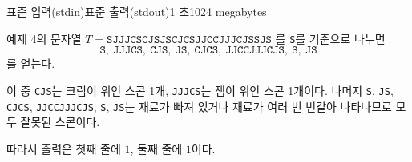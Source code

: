 \begin{problem}{\probtitle}{표준 입력(stdin)}{표준 출력(stdout)}{1 초}{1024 megabytes}
\Example

\begin{example}
\end{example}

\Notes

예제 4의 문자열 $T=\texttt{SJJJCSCJSJSCJCSJJCCJJJCJSSJS}$ 를 \texttt{S}를 기준으로 나누면
\[
\texttt{S},\ \texttt{JJJCS},\ \texttt{CJS},\ \texttt{JS},\ \texttt{CJCS},\ \texttt{JJCCJJJCJS},\ \texttt{S},\ \texttt{JS}
\]
를 얻는다.

이 중 \texttt{CJS}는 크림이 위인 스콘 1개, \texttt{JJJCS}는 잼이 위인 스콘 1개이다.
나머지 \texttt{S}, \texttt{JS}, \texttt{CJCS}, \texttt{JJCCJJJCJS}, \texttt{S}, \texttt{JS}는
재료가 빠져 있거나 재료가 여러 번 번갈아 나타나므로 모두 잘못된 스콘이다.

따라서 출력은 첫째 줄에 $1$, 둘째 줄에 $1$이다.

\end{problem}